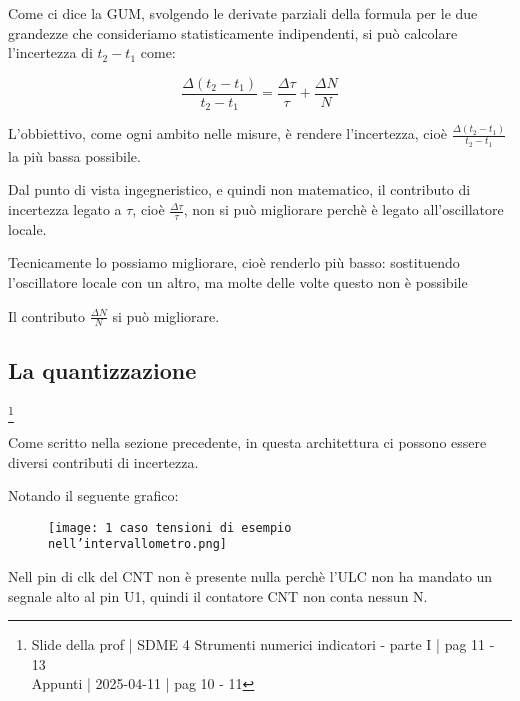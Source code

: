 Come ci dice la GUM, svolgendo le derivate parziali della formula per le due grandezze che consideriamo statisticamente indipendenti, 
si può calcolare l'incertezza di $t_2 - t_1$ come: 

{
    \Large 
    \begin{equation}
        \frac{\Delta (t_2 - t_1)}{t_2 - t_1}
        = 
        \frac{\Delta \tau}{\tau} 
        + 
        \frac{\Delta N}{N}
    \end{equation}
}

L'obbiettivo, come ogni ambito nelle misure, è rendere l'incertezza, cioè $\frac{\Delta (t_2 - t_1)}{t_2 - t_1}$ la più bassa possibile. \newline 

Dal punto di vista ingegneristico, e quindi non matematico, il contributo di incertezza legato a $\tau$, 
cioè $\frac{\Delta \tau}{\tau}$, non si può migliorare perchè è legato all'oscillatore locale. \newline 

\begin{tcolorbox}
    Tecnicamente lo possiamo migliorare, cioè renderlo più basso: sostituendo l'oscillatore locale con un altro, ma molte delle volte questo non è possibile
\end{tcolorbox}

Il contributo $\frac{\Delta N}{N}$ si può migliorare. \newline 

\newpage 


\subsection{La quantizzazione}
\footnote{Slide della prof | SDME 4 Strumenti numerici indicatori - parte I | pag 11 - 13 \\  
Appunti | 2025-04-11 | pag 10 - 11}

Come scritto nella sezione precedente, in questa architettura ci possono essere diversi contributi di incertezza. \newline 

Notando il seguente grafico: 

\begin{figure}[h]
    \centering
    \texttt{[image: 1 caso tensioni di esempio nell'intervallometro.png]}
\end{figure}

Nell pin di clk del CNT non è presente nulla perchè l'ULC non ha mandato un segnale alto al pin U1, 
quindi il contatore CNT non conta nessun N. \newline 

